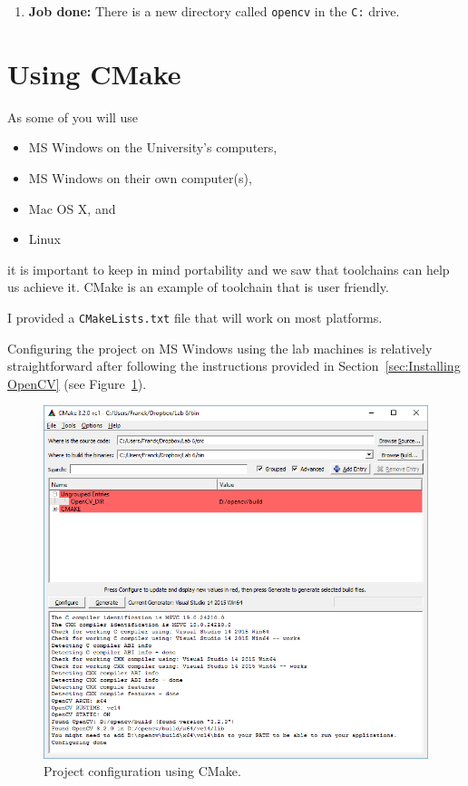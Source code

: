 \documentclass[english,a4paper,12pt,oneside]{article}
\begin{document}
\begin{itemize}
\begin{enumerate}
	\item \textbf{Job done:} There is a new directory called \verb+opencv+ in the \verb+C:+ drive.  
		 \end{enumerate}
\end{itemize}



\newpage


\section{Using CMake}

As some of you will use
\begin{itemize}
 \item MS Windows on the University's computers,
 \item MS Windows on their own computer(s),
 \item Mac OS X, and
 \item Linux
\end{itemize}
it is important to keep in mind portability and we saw that toolchains can help us achieve it. 
CMake is an example of toolchain that is user friendly. 

I provided a \verb+CMakeLists.txt+ file that will work on most platforms. 


Configuring the project on MS Windows using the lab machines is relatively straightforward after following the instructions provided in Section~\ref{sec:Installing OpenCV} (see Figure~\ref{fig:config proj}). 
	\begin{figure}[tbhp]
	\includegraphics[width=\textwidth]{cmake}
	\caption{\label{fig:config proj}Project configuration using CMake.}
\end{figure}
\end{document}
